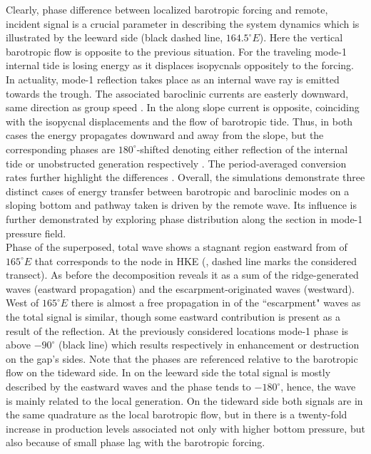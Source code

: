 \documentclass[12pt]{article}
\begin{document}
Clearly, phase difference between localized barotropic forcing and remote, incident signal is a 
crucial parameter in describing the system dynamics which is illustrated by the leeward side (black 
dashed line, $164.5^{\circ}E$). Here the vertical barotropic flow is opposite to the previous 
situation. For  the traveling mode-1 internal tide is losing energy as it displaces 
isopycnals oppositely to the forcing. In actuality, mode-1 reflection takes place as an internal 
wave ray is emitted towards the trough. The associated baroclinic currents are easterly downward, 
same direction as group speed . In  the along slope current 
is opposite, coinciding with the isopycnal displacements and the flow of barotropic tide. Thus, in 
both cases the energy propagates downward and away from the slope, but the corresponding phases are 
$180^{\circ}$-shifted denoting either reflection of the internal tide or unobstructed generation 
respectively . The period-averaged conversion rates further highlight the 
differences . Overall, the simulations demonstrate three distinct cases 
of energy transfer between barotropic and baroclinic modes on a sloping bottom and pathway taken 
is driven by the remote wave. Its influence is further demonstrated by exploring phase distribution 
along the section  in mode-1 pressure field.\\

Phase of the superposed, total wave shows a stagnant region eastward from of $165^{\circ}E$ that 
corresponds to the 
node in HKE (, dashed line marks the considered transect). As before 
the decomposition reveals it as a sum of the ridge-generated waves (eastward propagation) and the 
escarpment-originated waves (westward). West of $165^{\circ}E$ there is almost a free propagation 
in  of the ``escarpment" waves as the total signal is similar, though some eastward 
contribution is present as a result of the reflection. At the previously considered locations 
mode-1 phase is above $-90^{\circ}$ (black line) which results respectively in enhancement or 
destruction on the gap's sides. Note that the phases are referenced relative to the barotropic 
flow on the tideward side. In  on the leeward side the total signal is mostly described 
by the eastward waves and the phase tends to $-180^{\circ}$, hence, the wave is mainly related to 
the local generation. On the tideward side both signals are in the same quadrature as the local 
barotropic flow, but in  there is a twenty-fold increase in production levels 
associated not only with higher bottom pressure, but also because of small phase lag with the 
barotropic forcing.
\end{document}
